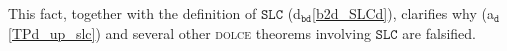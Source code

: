 \documentclass[ao]{iosart2x}
\newcommand{\bflist}{\begin{list}{}{\setlength{\topsep}{2mm}\setlength{\parsep}{0mm}\setlength{\leftmargin}{9.2mm}\setlength{\labelwidth}{8mm}}}
\newcommand{\eflist}{\end{list}}
\newcommand{\dolceAxLabel}{\textrm{a$_\texttt{d}$}}
\newcommand{\dolceAxLabelscript}{\scriptsize \textrm{a$_\texttt{d}$}}
\newcommand{\dolceDefLabel}{\textrm{d$_\texttt{d}$}}
\newcommand{\bdDefLabel}{\textrm{d$_\texttt{bd}$}}
\newcommand{\bdThrLabel}{\textrm{t$_\texttt{bd}$}}
\newcounter{cntax}
\newcommand{\dolceax}[1]{\refstepcounter{cntax}\begin{small}{\bf \dolceAxLabelscript\thecntax\label{#1}}\end{small}}
\newcounter{cntdef}
\newcommand{\dolcedf}[1]{\refstepcounter{cntdef}\begin{small}{\bf \dolceDefLabel\thecntdef\label{#1}}\end{small}}
\newcounter{cntbdth}
\newcommand{\bdth}[1]{\refstepcounter{cntbdth}\begin{small}{\bf \bdThrLabel\thecntbdth\label{#1}}\end{small}}
\newcommand{\refdolceax}[1]{({\dolceAxLabel}\ref{#1})}
\newcommand{\refbddf}[1]{({\bdDefLabel}\ref{#1})}
\newcommand{\refbdth}[1]{({\bdThrLabel}\ref{#1})}
\newcommand{\pr}[1]{\mathtt{#1}}
\newcommand{\prbfo}[1]{{\textit{{#1}}}}
\newcommand\textequal{%
 \rule[.08ex]{5pt}{0.35pt}\llap{\rule[.78ex]{5pt}{0.35pt}}}
\newcommand{\sdef}{{\hspace{1.5pt}:\hspace{-2.5pt}\textequal\hspace{3pt}}}
\newcommand{\dolce}{{\textsc{dolce}}}
\newcommand{\bfo}{{\textsc{bfo}}}
\newcommand {\thbfobdmap} {\ensuremath{\mathfrak{B}_\texttt{d}}}
\newcommand {\EDdcat} {\textsc{ed}}
\newcommand {\PDdcat} {\textsc{pd}}
\newcommand {\Qdcat} {\textsc{q}}
\newcommand {\TPd} {\ensuremath{\pr{tP}}}
\newcommand {\SUMd} {\ensuremath{\pr{SUM}}}
\newcommand {\Pd} {\ensuremath{\pr{P}}}
\newcommand {\PREd} {\ensuremath{\pr{PRE}}}
\newcommand {\PCd} {\ensuremath{\pr{PC}}}
\newcommand {\SLCd} {\ensuremath{\pr{SLC}}}
\newcommand {\TLCd} {\ensuremath{\pr{TLC}}}
\newcommand{\bfocpart}{\prbfo{cP}}
\newcommand{\bfoopart}{\prbfo{oP}}
\newcommand{\bfooccurs}{\prbfo{OCCIN}}
\newcommand{\bfolocated}{\prbfo{LOC}}
\newcommand{\bfosregof}{\prbfo{sREG}}
\newcommand{\bfotproj}{\prbfo{tPROJ}}
\newcommand{\bfosproj}{\prbfo{sPROJ}}
\begin{document}
This fact, together with the definition of $\SLCd$ \refbddf{b2d_SLCd}, clarifies why \refdolceax{TPd_up_slc} and several other {\dolce} theorems involving $\SLCd$ are falsified.
%

%
%
%
%
%
\end{document}
